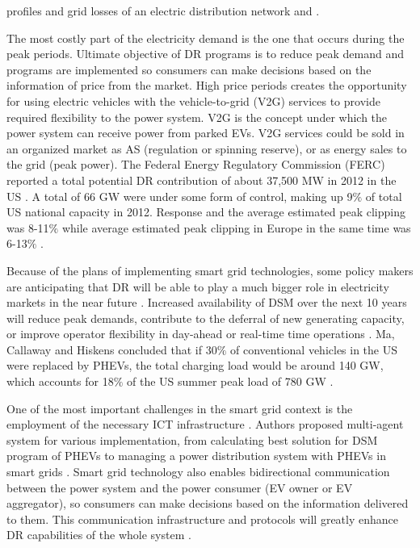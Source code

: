 \documentclass[a4paper,11pt,twoside,openright]{report}
\begin{document}
profiles and grid losses of an electric distribution network \cite{Venkatesan2012} and \cite{Sundstrom}. 

The most costly part of the electricity demand is the one that occurs during the peak periods. Ultimate objective of DR programs is to reduce peak demand and programs are implemented so consumers can make decisions based on the information of price from the market. High price periods creates the opportunity for using electric vehicles with the vehicle-to-grid (V2G) services to provide required flexibility to the power system. V2G is the concept under which the power system can receive power from parked EVs. V2G services could be sold in an organized market as AS (regulation or spinning reserve), or as energy sales to the grid (peak power). The Federal Energy Regulatory Commission (FERC) reported a total potential DR contribution of about 37,500 MW in 2012 in the US \cite{Martini}. A total of 66 GW were under some form of control, making up 9$\%$ of total US national capacity in 2012. Response and the average estimated peak clipping was 8-11$\%$ while average estimated peak clipping in Europe in the same time was 6-13$\%$ \cite{Stromback}. 

Because of the plans of implementing smart grid technologies, some policy makers are anticipating that DR will be able to play a much bigger role in electricity markets in the near future \cite{Walawalkar}. Increased availability of DSM over the next 10 years will reduce peak demands, contribute to the deferral of new generating capacity, or improve operator flexibility in day-ahead or real-time time operations \cite{Stromback}. Ma, Callaway and Hiskens concluded that if 30$\%$ of conventional vehicles in the US were replaced by PHEVs, the total charging load would be around 140 GW, which accounts for 18$\%$ of the US summer peak load of 780 GW \cite{Ma2010}.

One of the most important challenges in the smart grid context is the employment of the necessary ICT infrastructure \cite{Vrba}. Authors proposed multi-agent system for various implementation, from calculating best solution for DSM program of PHEVs \cite{Vandael} to managing a power distribution system with PHEVs in smart grids \cite{Logenthiran}. Smart grid technology also enables bidirectional communication between the power system and the power consumer (EV owner or EV aggregator), so consumers can make decisions based on the information delivered to them. This communication infrastructure and protocols will greatly enhance DR capabilities of the whole system \cite{Fan}.
\end{document}
